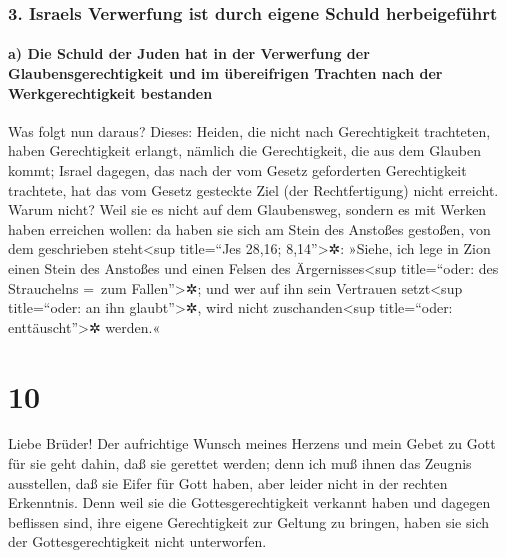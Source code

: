 \hypertarget{israels-verwerfung-ist-durch-eigene-schuld-herbeigefuxfchrt}{%
\subsubsection{3. Israels Verwerfung ist durch eigene Schuld
herbeigeführt}\label{israels-verwerfung-ist-durch-eigene-schuld-herbeigefuxfchrt}}

\hypertarget{a-die-schuld-der-juden-hat-in-der-verwerfung-der-glaubensgerechtigkeit-und-im-uxfcbereifrigen-trachten-nach-der-werkgerechtigkeit-bestanden}{%
\paragraph{a) Die Schuld der Juden hat in der Verwerfung der
Glaubensgerechtigkeit und im übereifrigen Trachten nach der
Werkgerechtigkeit
bestanden}\label{a-die-schuld-der-juden-hat-in-der-verwerfung-der-glaubensgerechtigkeit-und-im-uxfcbereifrigen-trachten-nach-der-werkgerechtigkeit-bestanden}}

 Was folgt nun daraus? Dieses: Heiden, die nicht nach
Gerechtigkeit trachteten, haben Gerechtigkeit erlangt, nämlich die
Gerechtigkeit, die aus dem Glauben kommt;  Israel
dagegen, das nach der vom Gesetz geforderten Gerechtigkeit trachtete,
hat das vom Gesetz gesteckte Ziel (der Rechtfertigung) nicht erreicht.
 Warum nicht? Weil sie es nicht auf dem Glaubensweg,
sondern es mit Werken haben erreichen wollen: da haben sie sich am Stein
des Anstoßes gestoßen,  von dem geschrieben
steht\textless sup title=``Jes 28,16; 8,14''\textgreater✲: »Siehe, ich
lege in Zion einen Stein des Anstoßes und einen Felsen des
Ärgernisses\textless sup title=``oder: des Strauchelns =~zum
Fallen''\textgreater✲; und wer auf ihn sein Vertrauen setzt\textless sup
title=``oder: an ihn glaubt''\textgreater✲, wird nicht
zuschanden\textless sup title=``oder: enttäuscht''\textgreater✲ werden.«

\hypertarget{section-9}{%
\section{10}\label{section-9}}

 Liebe Brüder! Der aufrichtige Wunsch meines Herzens und
mein Gebet zu Gott für sie geht dahin, daß sie gerettet werden;
 denn ich muß ihnen das Zeugnis ausstellen, daß sie Eifer
für Gott haben, aber leider nicht in der rechten Erkenntnis.
 Denn weil sie die Gottesgerechtigkeit verkannt haben und
dagegen beflissen sind, ihre eigene Gerechtigkeit zur Geltung zu
bringen, haben sie sich der Gottesgerechtigkeit nicht unterworfen.

